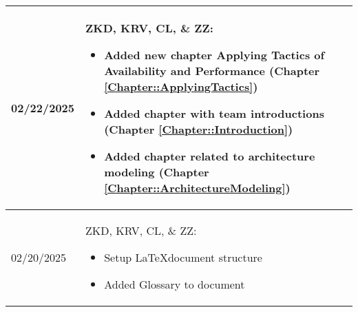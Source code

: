 \begin{longtable}{|l||p{13.5cm}|}
02/22/2025 & ZKD, KRV, CL, \& ZZ:
\begin{itemize}[topsep=0pt,itemsep=0pt,parsep=0pt,partopsep=0pt,leftmargin=12pt]
    \item Added new chapter Applying Tactics of Availability and Performance (Chapter \ref{Chapter::ApplyingTactics})
    \item Added chapter with team introductions (Chapter \ref{Chapter::Introduction})
    \item Added chapter related to architecture modeling (Chapter \ref{Chapter::ArchitectureModeling})
\end{itemize} 
\\ \hline

02/20/2025 & ZKD, KRV, CL, \& ZZ:
\begin{itemize}[topsep=0pt,itemsep=0pt,parsep=0pt,partopsep=0pt,leftmargin=12pt]
    \item Setup \LaTeX document structure
    \item Added Glossary to document
\end{itemize} 
\\ \hline

\end{longtable}


